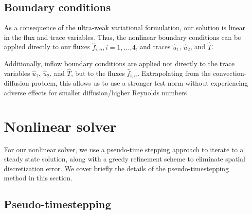 \subsection{Boundary conditions}

As a consequence of the ultra-weak variational formulation, our solution is linear in the flux and trace variables. Thus, the nonlinear boundary conditions can be applied directly to our fluxes $\widehat{f}_{i,n}, i = 1,\ldots,4$, and traces $\widehat{u}_1$, $\widehat{u}_2$, and $\widehat{T}$. 

Additionally, inflow boundary conditions are applied not directly to the trace variables $\widehat{u}_1$, $\widehat{u}_2$, and $\widehat{T}$, but to the fluxes $\widehat{f}_{i,n}$. Extrapolating from the convection-diffusion problem, this allows us to use a stronger test norm without experiencing adverse effects for smaller diffusion/higher Reynolds numbers \cite{DPGrobustness,DPGrobustness2}.

\section{Nonlinear solver}

For our nonlinear solver, we use a pseudo-time stepping approach to iterate to a steady state solution, along with a greedy refinement scheme to eliminate spatial discretization error.  We cover briefly the details of the pseudo-timestepping method in this section.  

\subsection{Pseudo-timestepping}

